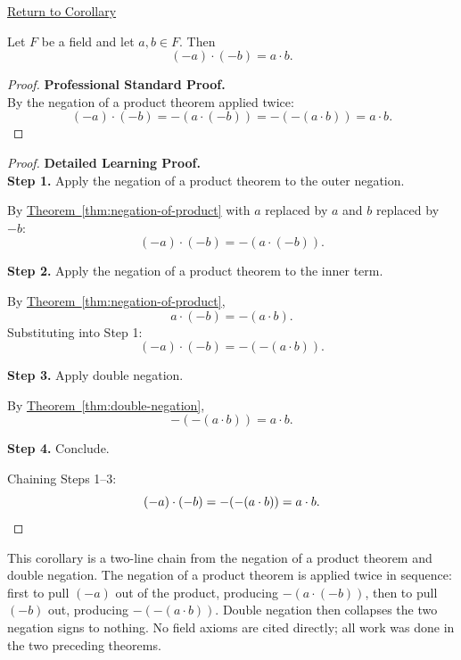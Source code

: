\newpage
{}
\label{prf:product-of-negatives}

\begin{remark*}[Return]
\hyperref[cor:product-of-negatives]{Return to Corollary}
\end{remark*}

\begin{corollary*}
Let $F$ be a field and let $a,b\in F$.  Then
\[
(-a)\cdot(-b) = a\cdot b.
\]
\end{corollary*}

\begin{proof}
\textbf{Professional Standard Proof.}~\\
By the negation of a product theorem applied twice:
\[
(-a)\cdot(-b) = -(a\cdot(-b)) = -(-(a\cdot b)) = a\cdot b.
\]
\end{proof}

\begin{proof}
\textbf{Detailed Learning Proof.}~\\

\textbf{Step 1.} Apply the negation of a product theorem to the outer negation.

By \hyperref[thm:negation-of-product]{Theorem~\ref*{thm:negation-of-product}}
with $a$ replaced by $a$ and $b$ replaced by $-b$:
\[
(-a)\cdot(-b) = -(a\cdot(-b)).
\]

\textbf{Step 2.} Apply the negation of a product theorem to the inner term.

By \hyperref[thm:negation-of-product]{Theorem~\ref*{thm:negation-of-product}},
\[
a\cdot(-b) = -(a\cdot b).
\]
Substituting into Step 1:
\[
(-a)\cdot(-b) = -(-(a\cdot b)).
\]

\textbf{Step 3.} Apply double negation.

By \hyperref[thm:double-negation]{Theorem~\ref*{thm:double-negation}},
\[
-(-(a\cdot b)) = a\cdot b.
\]

\textbf{Step 4.} Conclude.

Chaining Steps 1--3:
\[
(-a)\cdot(-b) = -(-(a\cdot b)) = a\cdot b. \qedhere
\]
\end{proof}

\begin{remark*}
This corollary is a two-line chain from the negation of a product theorem
and double negation.  The negation of a product theorem is applied twice in
sequence: first to pull $(-a)$ out of the product, producing $-(a\cdot(-b))$,
then to pull $(-b)$ out, producing $-(-(a\cdot b))$.  Double negation then
collapses the two negation signs to nothing.  No field axioms are cited
directly; all work was done in the two preceding theorems.
\end{remark*}

